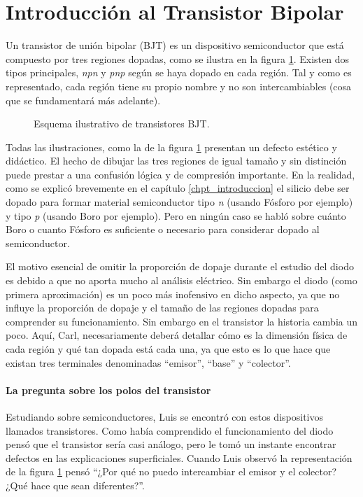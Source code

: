 \section{Introducción al Transistor Bipolar}

Un transistor de unión bipolar (BJT) es un dispositivo semiconductor que está compuesto por tres regiones dopadas, como se ilustra en la figura \ref{fig_ilustracion_bjt}. Existen dos tipos principales, \emph{npn} y \emph{pnp} según se haya dopado en cada región. Tal y como es representado, cada región tiene su propio nombre y no son intercambiables (cosa que se fundamentará más adelante).

\begin{figure}[!ht]
  \centering
  
  \caption{Esquema ilustrativo de transistores BJT.}
  \label{fig_ilustracion_bjt}
\end{figure}

Todas las ilustraciones, como la de la figura \ref{fig_ilustracion_bjt} presentan un defecto estético y didáctico. El hecho de dibujar las tres regiones de igual tamaño y sin distinción puede prestar a una confusión lógica y de compresión importante. En la realidad, como se explicó brevemente en el capítulo \ref{chpt_introduccion} el silicio debe ser dopado para formar material semiconductor tipo \emph{n} (usando Fósforo por ejemplo) y tipo \emph{p} (usando Boro por ejemplo). Pero en ningún caso se habló sobre cuánto Boro o cuanto Fósforo es suficiente o necesario para considerar dopado al semiconductor.

El motivo esencial de omitir la proporción de dopaje durante el estudio del diodo es debido a que no aporta mucho al análisis eléctrico. Sin embargo el diodo (como primera aproximación) es un poco más inofensivo en dicho aspecto, ya que no influye la proporción de dopaje y el tamaño de las regiones dopadas para comprender su funcionamiento. Sin embargo en el transistor la historia cambia un poco. Aquí, Carl, necesariamente deberá detallar cómo es la dimensión física de cada región y qué tan dopada está cada una, ya que esto es lo que hace que existan tres terminales denominadas ``emisor'', ``base'' y ``colector''.

\paragraph{La pregunta sobre los polos del transistor} Estudiando sobre semiconductores, Luis se encontró con estos dispositivos llamados transistores. Como había comprendido el funcionamiento del diodo pensó que el transistor sería casi análogo, pero le tomó un instante encontrar defectos en las explicaciones superficiales. Cuando Luis observó la representación de la figura \ref{fig_ilustracion_bjt} pensó ``¿Por qué no puedo intercambiar el emisor y el colector? ¿Qué hace que sean diferentes?''. 

